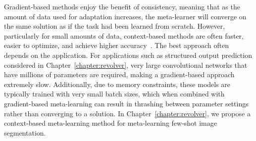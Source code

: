 Gradient-based methods enjoy the benefit of consistency, meaning that as the amount of data used for adaptation increases, the meta-learner will converge on the same solution as if the task had been learned from scratch.
However, particularly for small amounts of data, context-based methods are often faster, easier to optimize, and achieve higher accuracy~\citep{rakelly2019efficient, ren2020ocean}.
The best approach often depends on the application.
For applications such as structured output prediction considered in Chapter~\ref{chapter:revolver}, very large convolutional networks that have millions of parameters are required, making a gradient-based approach extremely slow.
Additionally, due to memory constraints, these models are typically trained with very small batch sizes, which when combined with gradient-based meta-learning can result in thrashing between parameter settings rather than converging to a solution. 
In Chapter~\ref{chapter:revolver}, we propose a context-based meta-learning method for meta-learning few-shot image segmentation.

